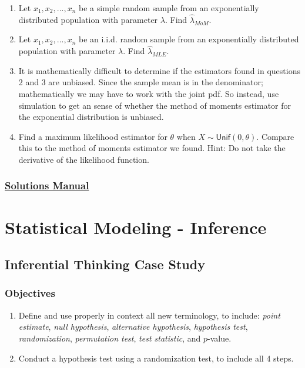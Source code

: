 \documentclass[
  letterpaper,
  DIV=11,
  numbers=noendperiod]{scrreprt}
\begin{document}
\begin{enumerate}
\def\labelenumi{\arabic{enumi}.}
\setcounter{enumi}{1}
\item
  Let \(x_1,x_2,...,x_n\) be a simple random sample from an
  exponentially distributed population with parameter \(\lambda\). Find
  \(\hat{\lambda}_{MoM}\).
\item
  Let \(x_1,x_2,...,x_n\) be an i.i.d. random sample from an
  exponentially distributed population with parameter \(\lambda\). Find
  \(\hat{\lambda}_{MLE}\).
\item
  It is mathematically difficult to determine if the estimators found in
  questions 2 and 3 are unbiased. Since the sample mean is in the
  denominator; mathematically we may have to work with the joint pdf. So
  instead, use simulation to get an sense of whether the method of
  moments estimator for the exponential distribution is unbiased.
\item
  Find a maximum likelihood estimator for \(\theta\) when
  \(X\sim\textsf{Unif}(0,\theta)\). Compare this to the method of
  moments estimator we found. Hint: Do not take the derivative of the
  likelihood function.
\end{enumerate}

\section*{\texorpdfstring{\href{https://ds-usafa.github.io/CPS-Solutions-Manual/EST.html}{Solutions
Manual}}{Solutions Manual}}\label{solutions-manual-17}


\part{Statistical Modeling - Inference}

\chapter{Inferential Thinking Case Study}\label{CS3}

\section{Objectives}\label{objectives-18}

\begin{enumerate}
\def\labelenumi{\arabic{enumi})}
\item
  Define and use properly in context all new terminology, to include:
  \emph{point estimate}, \emph{null hypothesis}, \emph{alternative
  hypothesis}, \emph{hypothesis test}, \emph{randomization},
  \emph{permutation test}, \emph{test statistic}, and \(p\)-value.
\item
  Conduct a hypothesis test using a randomization test, to include all 4
  steps.
\end{enumerate}
\end{document}
